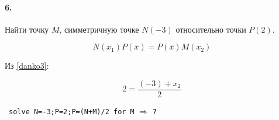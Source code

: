 
\paragraph{6.} Найти точку $M$, симметричную точке $N(-3)$ относительно точки
$P(2)$.

\begin{equation*}
N(x_1)P(\bar x)=P(\bar x)M(x_2)
\end{equation*}

Из \ref{danko3}:

\begin{equation*}
2 = \frac{(-3)+x_2}{2}
\end{equation*}

\wolfram\ \verb|solve N=-3;P=2;P=(N+M)/2 for M| $\Rightarrow$ \verb|7|



\secup



\secup